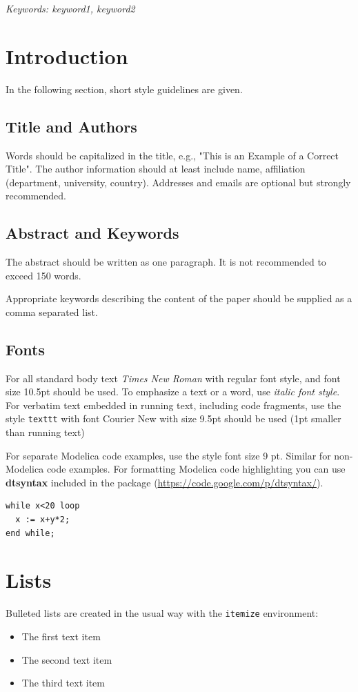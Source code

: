 \documentclass[11pt,a4paper,twocolumn]{article}
\renewcommand{\small}{\fontsize{9.5pt}{11.1pt}\selectfont}
\begin{document}
\noindent\emph{Keywords: keyword1, keyword2}

\section{Introduction}

In the following section, short style guidelines are given.

\subsection{Title and Authors}
Words should be capitalized in the title, e.g., "This is an Example of
a Correct Title".  The author information should at least include
name, affiliation (department, university, country). Addresses and
emails are optional but strongly recommended. 

\subsection{Abstract and Keywords}

The abstract should be written as one paragraph. It is not recommended
to exceed 150 words. 

Appropriate keywords describing the content of the paper should be
supplied as a comma separated list. 

\subsection{Fonts}

For all standard body text \textit{Times New Roman} with regular font style, and font size 10.5pt should be used. To emphasize a text or a word, use \textit{italic font style}. For verbatim text embedded in running text, including code fragments, use the style {\small\texttt{texttt}} with font Courier New with size 9.5pt should be used (1pt smaller than running text)

For separate Modelica code examples, use the style font size 9 pt.  Similar for non-Modelica code examples. For formatting Modelica code highlighting you can use \textbf{dtsyntax} included in the package 
({\small\url{https://code.google.com/p/dtsyntax/}}).
 
\begin{lstlisting}
while x<20 loop
  x := x+y*2;  
end while;  
\end{lstlisting}

\section{Lists}
Bulleted lists are created in the usual way with the \texttt{itemize} environment:
\begin{itemize}
  \item The first text item
  \item The second text item
  \item The third text item
\end{itemize}
\end{document}
